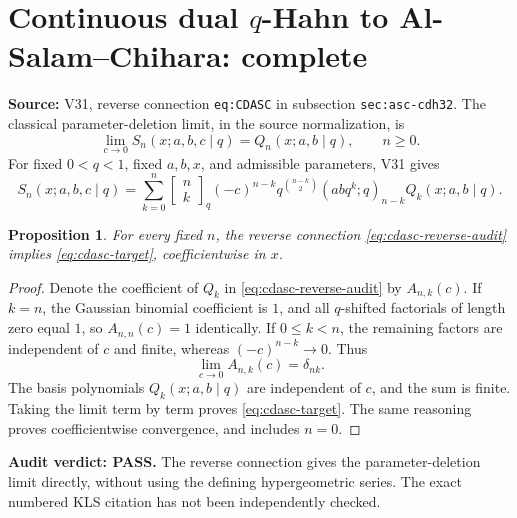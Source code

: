 \documentclass[11pt]{article}
\newtheorem{proposition}{Proposition}
\begin{document}
\section{Continuous dual $q$-Hahn to Al-Salam--Chihara: complete}
\noindent\textbf{Source:} V31, reverse connection \texttt{eq:CDASC} in subsection \texttt{sec:asc-cdh32}. The classical parameter-deletion limit, in the source normalization, is
\begin{equation}\label{eq:cdasc-target}
 \lim_{c\to0}S_n(x;a,b,c\mid q)=Q_n(x;a,b\mid q),\qquad n\ge0.
\end{equation}
For fixed $0<q<1$, fixed $a,b,x$, and admissible parameters, V31 gives
\begin{equation}\label{eq:cdasc-reverse-audit}
 S_n(x;a,b,c\mid q)=\sum_{k=0}^{n}
 \begin{bmatrix}n\\k\end{bmatrix}_q
 (-c)^{n-k}q^{\binom{n-k}{2}}(abq^k;q)_{n-k}
 Q_k(x;a,b\mid q).
\end{equation}
\begin{proposition}
For every fixed $n$, the reverse connection \eqref{eq:cdasc-reverse-audit} implies \eqref{eq:cdasc-target}, coefficientwise in $x$.
\end{proposition}
\begin{proof}
Denote the coefficient of $Q_k$ in \eqref{eq:cdasc-reverse-audit} by $A_{n,k}(c)$. If $k=n$, the Gaussian binomial coefficient is $1$, and all $q$-shifted factorials of length zero equal $1$, so $A_{n,n}(c)=1$ identically. If $0\le k<n$, the remaining factors are independent of $c$ and finite, whereas $(-c)^{n-k}\to0$. Thus
\[
 \lim_{c\to0}A_{n,k}(c)=\delta_{nk}.
\]
The basis polynomials $Q_k(x;a,b\mid q)$ are independent of $c$, and the sum is finite. Taking the limit term by term proves \eqref{eq:cdasc-target}. The same reasoning proves coefficientwise convergence, and includes $n=0$.
\end{proof}
\noindent\textbf{Audit verdict: PASS.} The reverse connection gives the parameter-deletion limit directly, without using the defining hypergeometric series. The exact numbered KLS citation has not been independently checked.
\end{document}
